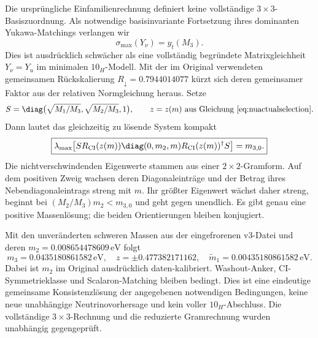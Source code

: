 Die ursprüngliche Einfamilienrechnung definiert keine vollständige $3\times3$-Basiszuordnung. Als notwendige basisinvariante Fortsetzung ihres dominanten Yukawa-Matchings verlangen wir
\begin{equation}
\sigma_{\max}(Y_\nu)=y_t(M_3).
\end{equation}
Dies ist ausdrücklich schwächer als eine vollständig begründete Matrixgleichheit $Y_\nu=Y_u$ im minimalen $10_H$-Modell. Mit der im Original verwendeten gemeinsamen Rückskalierung $R_\downarrow=0.7944014077$ kürzt sich deren gemeinsamer Faktor aus der relativen Normgleichung heraus. Setze
\begin{equation}
S=\diag\bigl(\sqrt{M_1/M_3},\sqrt{M_2/M_3},1\bigr),
\qquad z=z(m)\text{ aus Gleichung~\eqref{eq:nuactualselection}}.
\end{equation}
Dann lautet das gleichzeitig zu lösende System kompakt
\begin{equation}\label{eq:nujointmassnorm}
\boxed{\lambda_{\max}\!\left[
S R_{\rm CI}(z(m))\diag(0,m_2,m)R_{\rm CI}(z(m))^\dagger S
\right]=m_{3,0}.}
\end{equation}
Die nichtverschwindenden Eigenwerte stammen aus einer $2\times2$-Gramform. Auf dem positiven Zweig wachsen deren Diagonaleinträge und der Betrag ihres Nebendiagonaleintrags streng mit $m$. Ihr größter Eigenwert wächst daher streng, beginnt bei $(M_2/M_3)m_2<m_{3,0}$ und geht gegen unendlich. Es gibt genau eine positive Massenlösung; die beiden Orientierungen bleiben konjugiert.

Mit den unveränderten schweren Massen aus der eingefrorenen v3-Datei und deren $m_2=0.008654478609\,\mathrm{eV}$ folgt
\begin{equation}
\boxed{m_3=0.0435180861582\,\mathrm{eV},\quad
z=\pm0.477382171162,\quad
\widetilde m_1=0.00435180861582\,\mathrm{eV}.}
\end{equation}
Dabei ist $m_2$ im Original ausdrücklich daten-kalibriert. Washout-Anker, CI-Symmetrieklasse und Scalaron-Matching bleiben bedingt. Dies ist eine eindeutige gemeinsame Konsistenzlösung der angegebenen notwendigen Bedingungen, keine neue unabhängige Neutrinovorhersage und kein voller $10_H$-Abschluss. Die vollständige $3\times3$-Rechnung und die reduzierte Gramrechnung wurden unabhängig gegengeprüft.

